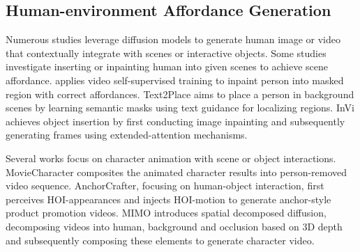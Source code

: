 \subsection{Human-environment Affordance Generation}
Numerous studies leverage diffusion models to generate human image or video that contextually integrate with scenes or interactive objects. Some studies\cite{putting,environment-specific,addme,text2place,invi} investigate inserting or inpainting human into given scenes to achieve scene affordance. \cite{putting} applies video self-supervised training to inpaint person into masked region with correct affordances. Text2Place\cite{text2place} aims to place a person in background scenes by learning semantic masks using text guidance for localizing regions. InVi\cite{invi} achieves object insertion by first conducting image inpainting and subsequently generating frames using extended-attention mechanisms.

Several works focus on character animation with scene or object interactions. MovieCharacter\cite{moviecharacter} composites the animated character results into person-removed video sequence. AnchorCrafter\cite{anchorcrafter}, focusing on human-object interaction, first perceives HOI-appearances and injects HOI-motion to generate anchor-style product promotion videos. MIMO\cite{mimo} introduces spatial decomposed diffusion, decomposing videos into human, background and occlusion based on 3D depth and subsequently composing these elements to generate character video.